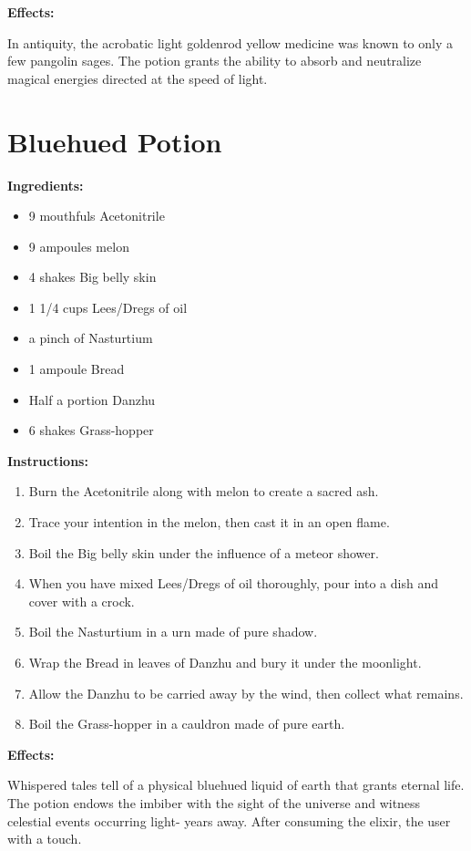 \documentclass{article}
\begin{document}
\textbf{Effects:}

In antiquity, the acrobatic light goldenrod yellow medicine was known to only a few pangolin sages. The potion grants the ability to absorb and neutralize magical energies directed at the speed of light.

\newpage
\section*{Bluehued Potion}

\textbf{Ingredients:}

\begin{itemize}
  \item 9 mouthfuls Acetonitrile
  \item 9 ampoules melon
  \item 4 shakes Big belly skin
  \item 1 1/4 cups Lees/Dregs of oil
  \item a pinch of Nasturtium
  \item 1 ampoule Bread
  \item Half a portion Danzhu
  \item 6 shakes Grass-hopper
\end{itemize}

\textbf{Instructions:}

\begin{enumerate}
  \item Burn the Acetonitrile along with melon to create a sacred ash.
  \item Trace your intention in the melon, then cast it in an open flame.
  \item Boil the Big belly skin under the influence of a meteor shower.
  \item When you have mixed Lees/Dregs of oil thoroughly, pour into a dish and cover with a crock.
  \item Boil the Nasturtium in a urn made of pure shadow.
  \item Wrap the Bread in leaves of Danzhu and bury it under the moonlight.
  \item Allow the Danzhu to be carried away by the wind, then collect what remains.
  \item Boil the Grass-hopper in a cauldron made of pure earth.
\end{enumerate}

\textbf{Effects:}

Whispered tales tell of a physical bluehued liquid of earth that grants eternal life. The potion endows the imbiber with the sight of the universe and witness celestial events occurring light- years away. After consuming the elixir, the user with a touch.
\end{document}
